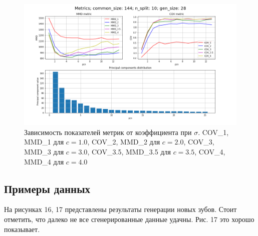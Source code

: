 \begin{figure}[h]
\includegraphics[width=1\linewidth]{images/c_diff_multiple.png}
\caption{Зависимость показателей метрик от коэффициента при $\sigma$.
COV\_1, MMD\_1 для $c = 1.0$,  COV\_2, MMD\_2 для $c = 2.0$,  COV\_3, MMD\_3 для $c = 3.0$,
COV\_3.5, MMD\_3.5 для $c = 3.5$,  COV\_4, MMD\_4 для $c = 4.0$}
\label{fig:c_diff_3}
\end{figure}

\subsection{Примеры данных}
На рисунках 16, 17 представлены результаты генерации новых зубов. Стоит отметить, что далеко не все сгенерированные данные удачны. Рис. 17 это хорошо показывает.

